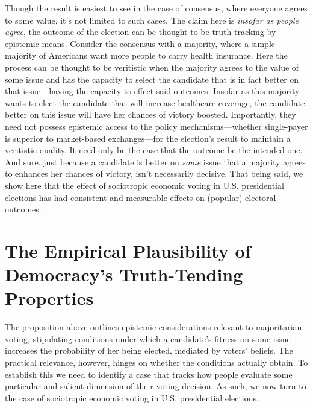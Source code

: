 \documentclass[11pt]{article}
\begin{document}
Though the result is easiest to see in the case of consensus, where everyone agrees to some value, it's not limited to such cases. The claim here is \emph{insofar as people agree}, the outcome of the election can be thought to be truth-tracking by epistemic means.  Consider the consensus with a majority, where a simple majority of Americans want more people to carry health insurance. 
 Here the process can be thought to be veritistic when the majority agrees to the value of some issue and has the capacity to select the candidate that is in fact better on that issue---having the capacity to effect said outcomes. Insofar as this majority wants to elect the candidate that will increase healthcare coverage, the candidate better on this issue will have her chances of victory boosted. Importantly, they need not possess epistemic access to the policy mechanisms---whether single-payer is superior to market-based exchanges---for the election's result to maintain a veritistic quality. It need only be the case that the outcome be the intended one. And sure, just because a candidate is better on \emph{some} issue that a majority agrees to enhances her chances of victory, isn't necessarily decisive. That being said, we show here that the effect of sociotropic economic voting in U.S. presidential elections  has had consistent and measurable  effects on (popular) electoral outcomes.
 
\section{The Empirical Plausibility of Democracy's Truth-Tending Properties}%
The proposition above outlines epistemic considerations relevant to majoritarian voting, stipulating conditions under which a candidate's fitness on some issue increases the probability of her being elected, mediated by voters' beliefs.
The practical relevance, however, hinges on whether the conditions actually obtain. To establish this we need to identify a case that tracks how people evaluate some particular and salient dimension of their voting decision. %
As such, we now turn to the case of sociotropic economic voting in U.S. presidential elections.
\end{document}
